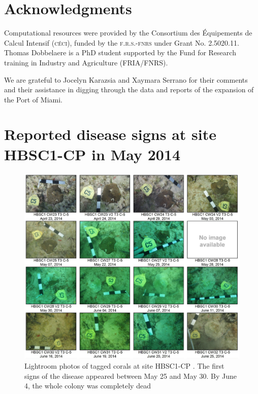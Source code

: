 \documentclass[preprint,12pt,authoryear]{elsarticle}
\begin{document}
\section*{Acknowledgments}
Computational resources were provided by the Consortium des \'Equipements de Calcul Intensif (\textsc{c\'eci}), funded by the \textsc{f.r.s.-fnrs} under Grant No. 2.5020.11. Thomas Dobbelaere is a PhD student supported by the Fund for Research training in Industry and Agriculture (\textsc{FRIA}/\textsc{FNRS}).

We are grateful to Jocelyn Karazsia and Xaymara Serrano for their comments and their assistance in digging through the data and reports of the expansion of the Port of Miami. 

 

\newpage
\appendix
\section{Reported disease signs at site HBSC1-CP in May 2014}\label{onset:appendice}
\begin{figure}[h!]
	\centering
	\includegraphics[width=\textwidth]{figures/hbsc1_cp.png}
	\caption{Lightroom photos of tagged corals at site HBSC1-CP \citep{dial2017}. The first signs of the disease appeared between May 25 and May 30. By June 4, the whole colony was completely dead}
\end{figure}
\newpage
\end{document}
